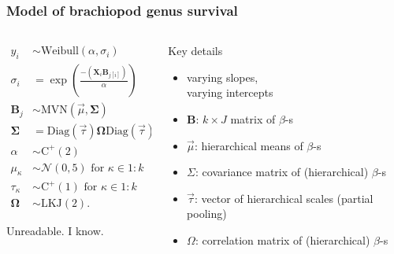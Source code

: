 \documentclass{beamer}
\begin{document}
\begin{frame}
  \frametitle{Model of brachiopod genus survival}
 
  \begin{columns}
    \begin{column}{0.5\textwidth}
      \begin{align*}
        y_{i} &\sim \mathrm{Weibull}(\alpha, \sigma_{i}) \\
        \sigma_{i} &= \exp\left(\frac{-(\mathbf{X}_{i} \mathbf{B}_{j[i]})}{\alpha}\right) \\
        \mathbf{B}_{j} &\sim \mathrm{MVN}(\vec{\mu}, \mathbf{\Sigma}) \\
        \mathbf{\Sigma} &= \text{Diag}(\vec{\tau}) \mathbf{\Omega} \text{Diag}(\vec{\tau}) \\
        \alpha &\sim \mathrm{C^{+}}(2) \\
        \mu_{\kappa} &\sim \mathcal{N}(0, 5) \text{ for } \kappa \in 1:k \\
        \tau_{\kappa} &\sim \mathrm{C^{+}}(1) \text{ for } \kappa \in 1:k \\
        \mathbf{\Omega} &\sim \text{LKJ}(2).
      \end{align*}

      \bigskip

      \footnotesize{Unreadable. I know.}
    \end{column}
    \begin{column}{0.5\textwidth}
      Key details
      \begin{itemize}
        \item varying slopes, \\varying intercepts
        \item \(\mathbf{B}\): \(k \times J\) matrix of \(\beta\)-s
        \item \(\vec{\mu}\): hierarchical means of \(\beta\)-s
        \item \(\Sigma\): covariance matrix of (hierarchical) \(\beta\)-s
        \item \(\vec{\tau}\): vector of hierarchical scales (partial pooling)
        \item \(\Omega\): correlation matrix of (hierarchical) \(\beta\)-s
      \end{itemize}

    \end{column}
  \end{columns}
\end{frame}
\end{document}
